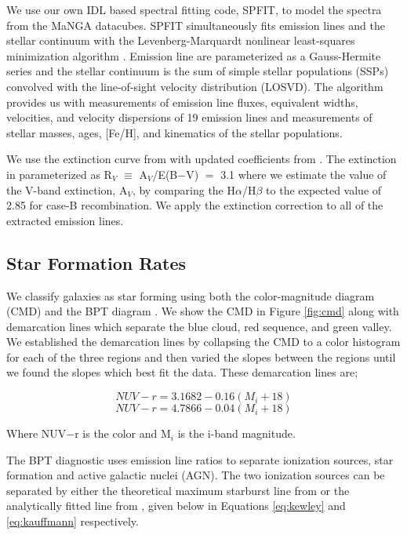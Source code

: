 \documentclass[iop,revtex4,twocolumn,apj,numberedappendix,appendixfloats]{emulateapj}
\begin{document}
We use our own {\sc IDL} based spectral fitting code, {\sc SPFIT}, to model the spectra from the MaNGA datacubes. {\sc SPFIT} simultaneously fits emission lines and the stellar continuum with the Levenberg-Marquardt nonlinear least-squares minimization algorithm \citep{Fu:2018}. Emission line are parameterized as a Gauss-Hermite series and the stellar continuum is the sum of simple stellar populations (SSPs) convolved with the line-of-sight velocity distribution (LOSVD). The algorithm provides us with measurements of emission line fluxes, equivalent widths, velocities, and velocity dispersions of 19 emission lines and measurements of stellar masses, ages, [Fe/H], and kinematics of the stellar populations. 

We use the extinction curve from \citet{Cardelli:1989} with updated coefficients from \citet{ODonnell:1994}. The extinction in parameterized as R$_V$ $\equiv$ A$_V$/E(B$-$V) $=$ 3.1 where we estimate the value of the V-band extinction, A$_V$, by comparing the H$\alpha$/H$\beta$ to the expected value of 2.85 for case-B recombination. We apply the extinction correction to all of the extracted emission lines.

\subsection{Star Formation Rates}
We classify galaxies as star forming using both the color-magnitude diagram (CMD) and the BPT diagram \citep{Baldwin:1981}. We show the CMD in Figure \ref{fig:cmd} along with demarcation lines which separate the blue cloud, red sequence, and green valley. We established the demarcation lines by collapsing the CMD to a color histogram for each of the three regions and then varied the slopes between the regions until we found the slopes which best fit the data. These demarcation lines are;

\begin{equation}\label{eq:blue}
NUV-r = 3.1682 - 0.16 (M_i+18)
\end{equation}
\begin{equation}\label{eq:red}
NUV-r = 4.7866 - 0.04 (M_i+18)
\end{equation}

Where NUV$-$r is the color and M$_i$ is the i-band magnitude. 

The BPT diagnostic uses emission line ratios to separate ionization sources, star formation and active galactic nuclei (AGN). The two ionization sources can be separated by either the theoretical maximum starburst line from \citet{Kewley:2001} or the analytically fitted line from \citet{Kauffmann:2003}, given below in Equations \ref{eq:kewley} and \ref{eq:kauffmann} respectively.
\end{document}
